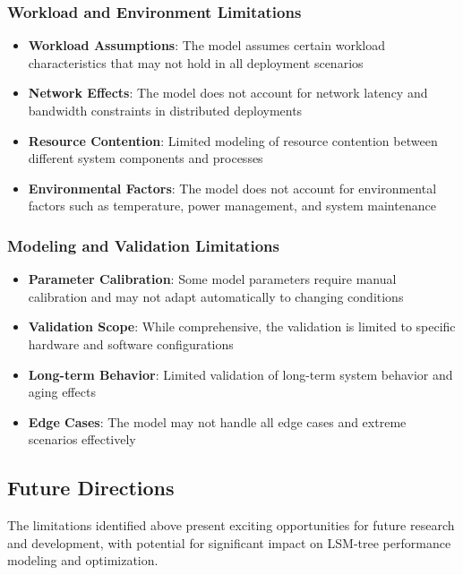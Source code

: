 \documentclass[11pt]{article}
\begin{document}
\subsubsection{Workload and Environment Limitations}
\begin{itemize}
    \item \textbf{Workload Assumptions}: The model assumes certain workload characteristics that may not hold in all deployment scenarios
    \item \textbf{Network Effects}: The model does not account for network latency and bandwidth constraints in distributed deployments
    \item \textbf{Resource Contention}: Limited modeling of resource contention between different system components and processes
    \item \textbf{Environmental Factors}: The model does not account for environmental factors such as temperature, power management, and system maintenance
\end{itemize}

\subsubsection{Modeling and Validation Limitations}
\begin{itemize}
    \item \textbf{Parameter Calibration}: Some model parameters require manual calibration and may not adapt automatically to changing conditions
    \item \textbf{Validation Scope}: While comprehensive, the validation is limited to specific hardware and software configurations
    \item \textbf{Long-term Behavior}: Limited validation of long-term system behavior and aging effects
    \item \textbf{Edge Cases}: The model may not handle all edge cases and extreme scenarios effectively
\end{itemize}

\subsection{Future Directions}

The limitations identified above present exciting opportunities for future research and development, with potential for significant impact on LSM-tree performance modeling and optimization.
\end{document}
